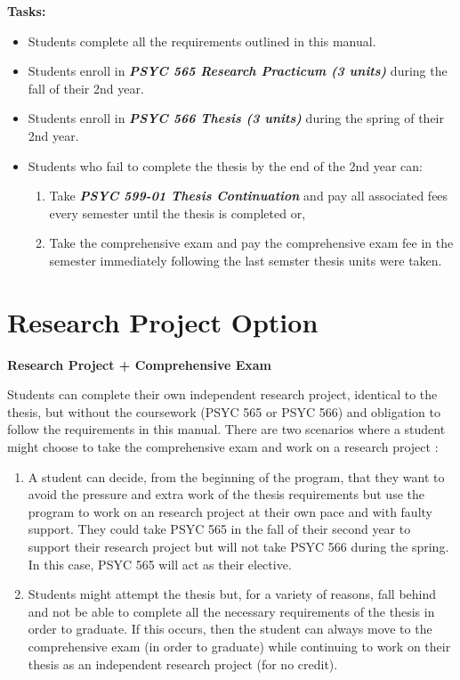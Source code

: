 \documentclass[openany]{book}
\providecommand{\tightlist}{%
  \setlength{\itemsep}{0pt}\setlength{\parskip}{0pt}}
\begin{document}
\textbf{Tasks:}

\begin{itemize}
\tightlist
\item
  Students complete all the requirements outlined in this manual.
\item
  Students enroll in \textbf{\emph{PSYC 565 Research Practicum (3 units)}} during the fall of their 2nd year.
\item
  Students enroll in \textbf{\emph{PSYC 566 Thesis (3 units)}} during the spring of their 2nd year.
\item
  Students who fail to complete the thesis by the end of the 2nd year can:

  \begin{enumerate}
  \def\labelenumi{\arabic{enumi}.}
  \tightlist
  \item
    Take \textbf{\emph{PSYC 599-01 Thesis Continuation}} and pay all associated fees every semester until the thesis is completed or,
  \item
    Take the comprehensive exam and pay the comprehensive exam fee in the semester immediately following the last semster thesis units were taken.
  \end{enumerate}
\end{itemize}

\hypertarget{research-project-option}{%
\section{Research Project Option}\label{research-project-option}}

\textbf{Research Project + Comprehensive Exam}

Students can complete their own independent research project, identical to the thesis, but without the coursework (PSYC 565 or PSYC 566) and obligation to follow the requirements in this manual. There are two scenarios where a student might choose to take the comprehensive exam and work on a research project :

\begin{enumerate}
\def\labelenumi{\arabic{enumi}.}
\item
  A student can decide, from the beginning of the program, that they want to avoid the pressure and extra work of the thesis requirements but use the program to work on an research project at their own pace and with faulty support. They could take PSYC 565 in the fall of their second year to support their research project but will not take PSYC 566 during the spring. In this case, PSYC 565 will act as their elective.
\item
  Students might attempt the thesis but, for a variety of reasons, fall behind and not be able to complete all the necessary requirements of the thesis in order to graduate. If this occurs, then the student can always move to the comprehensive exam (in order to graduate) while continuing to work on their thesis as an independent research project (for no credit).
\end{enumerate}
\end{document}
